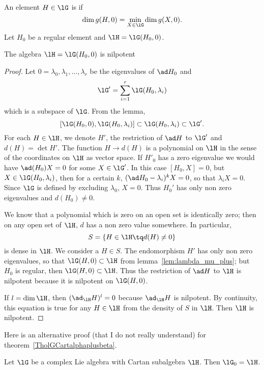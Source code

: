 An element $H\in\lG$ is  if
\[
\dim g(H,0)=\min_{X\in\lG}\dim g(X,0).
\]
Let $H_0$ be a regular element and $\lH=\lG(H_0,0)$.

\begin{lemma}
    The algebra $\lH=\lG(H_0,0)$ is nilpotent
\end{lemma}

\begin{proof}
Let $0=\lambda_0,\lambda_1,\ldots,\lambda_r$ be the eigenvalues of $\ad H_0$ and
\[
\lG'=\sum_{i=1}^{r} \lG(H_0,\lambda_i)
\]
which is a subspace of $\lG$. From the lemma,
\[
[\lG(H_0,0),\lG(H_0,\lambda_i)]\subset\lG(H_0,\lambda_i)\subset\lG'.
\]
For each $H\in\lH$, we denote $H'$, the restriction of $\ad H$ to $\lG'$ and $d(H)=\det H'$. The function $H\to d(H)$ is a polynomial on $\lH$ in the sense of the coordinates on $\lH$ as vector space. If $H'_0$ has a zero eigenvalue we would have $\ad(H_0)X=0$ for some $X\in\lG'$. In this case $[H_0,X]=0$, but $X\in\lG(H_0,\lambda_i)$, then for a certain $k$, $(\ad H_0-\lambda_i)^kX=0$, so that $\lambda_iX=0$. Since $\lG$ is defined by excluding $\lambda_0$, $X=0$. Thus $H_0'$ has only non zero eigenvalues and $d(H_0)\neq 0$.

We know that a polynomial which is zero on an open set is identically zero; then on any open set of $\lH$, $d$ has a non zero value somewhere. In particular,
\[
S=\{H\in\lH\tq d(H)\neq 0\}
\]
is dense in $\lH$. We consider a $H\in S$. The endomorphism $H'$ has only non zero eigenvalues, so that $\lG(H,0)\subset\lH$ from lemma~\ref{lem:lambda_mu_plus}; but $H_0$ is regular, then $\lG(H,0)\subset\lH$. Thus the restriction of $\ad H$ to $\lH$ is nilpotent because it is nilpotent on $\lG(H,0)$.

If $l=\dim\lH$, then $(\ad_{\lH}H)^l=0$ because $\ad_{\lH}H$ is nilpotent. By continuity, this equation is true for any $H\in\lH$ from the density of $S$ in $\lH$. Then $\lH$ is nilpotent.

\end{proof}


Here is an alternative proof (that I do not really understand) for theorem~\ref{TholGCartalphaplusbeta}.
\begin{theorem}
Let $\lG$ be a complex Lie algebra with Cartan subalgebra $\lH$. Then $\lG_0=\lH$.
\end{theorem}

